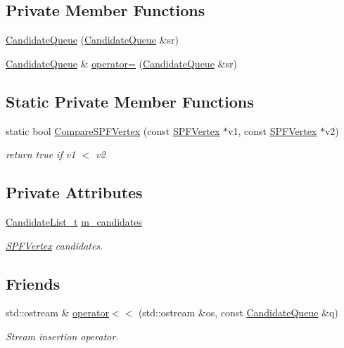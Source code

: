 \subsection*{Private Member Functions}
\begin{DoxyCompactItemize}
\item 
\hyperlink{classns3_1_1CandidateQueue_ac2cacce975f0a71d11d2b332025f77a5}{Candidate\+Queue} (\hyperlink{classns3_1_1CandidateQueue}{Candidate\+Queue} \&sr)
\item 
\hyperlink{classns3_1_1CandidateQueue}{Candidate\+Queue} \& \hyperlink{classns3_1_1CandidateQueue_affccccde4f810338ed519a27d073c862}{operator=} (\hyperlink{classns3_1_1CandidateQueue}{Candidate\+Queue} \&sr)
\end{DoxyCompactItemize}
\subsection*{Static Private Member Functions}
\begin{DoxyCompactItemize}
\item 
static bool \hyperlink{classns3_1_1CandidateQueue_a13b908ec4dca38705cd12d7c6684099e}{Compare\+S\+P\+F\+Vertex} (const \hyperlink{classns3_1_1SPFVertex}{S\+P\+F\+Vertex} $\ast$v1, const \hyperlink{classns3_1_1SPFVertex}{S\+P\+F\+Vertex} $\ast$v2)
\begin{DoxyCompactList}\small\item\em return true if v1 $<$ v2 \end{DoxyCompactList}\end{DoxyCompactItemize}
\subsection*{Private Attributes}
\begin{DoxyCompactItemize}
\item 
\hyperlink{classns3_1_1CandidateQueue_a8cd2e310f0b257a519afecbf5aeb6f2e}{Candidate\+List\+\_\+t} \hyperlink{classns3_1_1CandidateQueue_ad07c79907f38c5da1e0b9761511de52a}{m\+\_\+candidates}
\begin{DoxyCompactList}\small\item\em \hyperlink{classns3_1_1SPFVertex}{S\+P\+F\+Vertex} candidates. \end{DoxyCompactList}\end{DoxyCompactItemize}
\subsection*{Friends}
\begin{DoxyCompactItemize}
\item 
std\+::ostream \& \hyperlink{classns3_1_1CandidateQueue_aff2dcd7238d70ba09eec55a6ae121247}{operator$<$$<$} (std\+::ostream \&os, const \hyperlink{classns3_1_1CandidateQueue}{Candidate\+Queue} \&q)
\begin{DoxyCompactList}\small\item\em Stream insertion operator. \end{DoxyCompactList}\end{DoxyCompactItemize}



